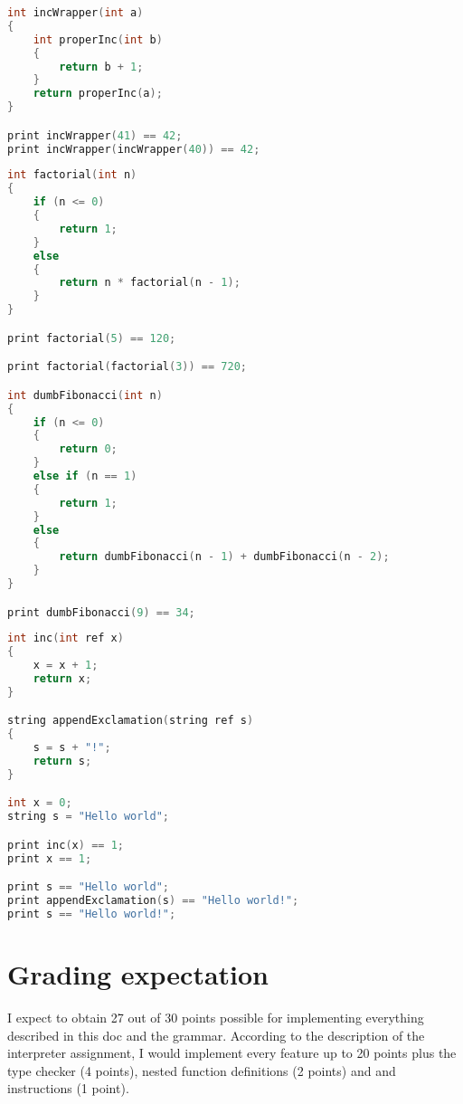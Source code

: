 \documentclass[11pt,a4paper]{article}
\newcommand{\jpp}[1]{\textit{\color{blue}{#1}}}
\begin{document}
\newpage

\begin{lstlisting}[language=C, caption=Nested definitions of functions]
int incWrapper(int a)
{
    int properInc(int b)
    {
        return b + 1;
    }
    return properInc(a);
}

print incWrapper(41) == 42;
print incWrapper(incWrapper(40)) == 42;
\end{lstlisting}

\begin{lstlisting}[language=C, caption=Recursion]
int factorial(int n)
{
    if (n <= 0)
    {
        return 1;
    }
    else
    {
        return n * factorial(n - 1);
    }
}

print factorial(5) == 120;

print factorial(factorial(3)) == 720;

int dumbFibonacci(int n)
{
    if (n <= 0)
    {
        return 0;
    }
    else if (n == 1)
    {
        return 1;
    }
    else
    {
        return dumbFibonacci(n - 1) + dumbFibonacci(n - 2);
    }
}

print dumbFibonacci(9) == 34;
\end{lstlisting}

\begin{lstlisting}[language=C, caption=Function arguments passed by reference]
int inc(int ref x)
{
    x = x + 1;
    return x;
}

string appendExclamation(string ref s)
{
    s = s + "!";
    return s;
}

int x = 0;
string s = "Hello world";

print inc(x) == 1;
print x == 1;

print s == "Hello world";
print appendExclamation(s) == "Hello world!";
print s == "Hello world!";
\end{lstlisting}

\section*{Grading expectation}
I expect to obtain 27 out of 30 points possible for implementing everything described in this doc and the grammar. According to the description of the interpreter assignment, I would implement every feature up to 20 points plus the type checker (4 points), nested function definitions (2 points) and \jpp{break} and \jpp{continue} instructions (1 point).
\end{document}
